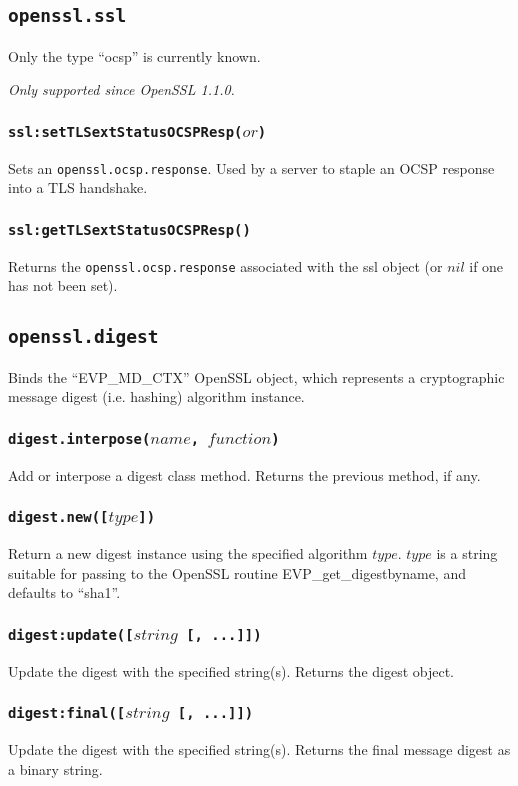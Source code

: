 \documentclass[11pt, oneside]{memoir}
\newcommand*{\fn}[1]{\texttt{#1}\xspace}
\newcommand*{\module}[1]{\texttt{#1}\xspace}
\newcounter{toccols}
\newenvironment{Module}[1]{
	\subsection{\texttt{#1}}
	\addtocontents{toc}{
		\protect\begin{multicols}{\value{toccols}}
	}
}{
	\addtocontents{toc}{\protect\end{multicols}}
}
\begin{document}
\begin{Module}{openssl.ssl}
Only the type ``ocsp'' is currently known.

\emph{Only supported since OpenSSL 1.1.0.}

\subsubsection[\fn{ssl:setTLSextStatusOCSPResp}]{\fn{ssl:setTLSextStatusOCSPResp($or$)}}

Sets an \module{openssl.ocsp.response}. Used by a server to staple an OCSP response into a TLS handshake.

\subsubsection[\fn{ssl:getTLSextStatusOCSPResp}]{\fn{ssl:getTLSextStatusOCSPResp()}}

Returns the \module{openssl.ocsp.response} associated with the ssl object (or $nil$ if one has not been set).

\end{Module}


\begin{Module}{openssl.digest}

Binds the ``EVP\_MD\_CTX'' OpenSSL object, which represents a cryptographic message digest (i.e. hashing) algorithm instance.

\subsubsection[\fn{digest.interpose}]{\fn{digest.interpose($name$, $function$)}}

Add or interpose a digest class method. Returns the previous method, if any.

\subsubsection[\fn{digest.new}]{\fn{digest.new([$type$])}}

Return a new digest instance using the specified algorithm $type$. $type$ is a string suitable for passing to the OpenSSL routine EVP\_get\_digestbyname, and defaults to ``sha1''.

\subsubsection[\fn{digest:update}]{\fn{digest:update([$string$ [, ...]])}}

Update the digest with the specified string(s). Returns the digest object.

\subsubsection[\fn{digest:final}]{\fn{digest:final([$string$ [, ...]])}}

Update the digest with the specified string(s). Returns the final message digest as a binary string.

\end{Module}
\end{document}
